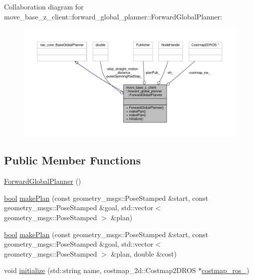 Collaboration diagram for move\+\_\+base\+\_\+z\+\_\+client\+:\+:forward\+\_\+global\+\_\+planner\+:\+:Forward\+Global\+Planner\+:\nopagebreak
\begin{figure}[H]
\begin{center}
\leavevmode
\includegraphics[width=350pt]{classmove__base__z__client_1_1forward__global__planner_1_1ForwardGlobalPlanner__coll__graph}
\end{center}
\end{figure}
\subsection*{Public Member Functions}
\begin{DoxyCompactItemize}
\item 
\hyperlink{classmove__base__z__client_1_1forward__global__planner_1_1ForwardGlobalPlanner_a9bbdde743629802b247441b8e955e114}{Forward\+Global\+Planner} ()
\item 
\hyperlink{classbool}{bool} \hyperlink{classmove__base__z__client_1_1forward__global__planner_1_1ForwardGlobalPlanner_a2dcf9aad74efaaa92ee78650f7a23096}{make\+Plan} (const geometry\+\_\+msgs\+::\+Pose\+Stamped \&start, const geometry\+\_\+msgs\+::\+Pose\+Stamped \&goal, std\+::vector$<$ geometry\+\_\+msgs\+::\+Pose\+Stamped $>$ \&plan)
\item 
\hyperlink{classbool}{bool} \hyperlink{classmove__base__z__client_1_1forward__global__planner_1_1ForwardGlobalPlanner_a16f21fc4735c26535517678d29a6f1f3}{make\+Plan} (const geometry\+\_\+msgs\+::\+Pose\+Stamped \&start, const geometry\+\_\+msgs\+::\+Pose\+Stamped \&goal, std\+::vector$<$ geometry\+\_\+msgs\+::\+Pose\+Stamped $>$ \&plan, double \&cost)
\item 
void \hyperlink{classmove__base__z__client_1_1forward__global__planner_1_1ForwardGlobalPlanner_aed754f82f2907720ed1410bb00922bf4}{initialize} (std\+::string name, costmap\+\_\+2d\+::\+Costmap2\+D\+R\+OS $\ast$\hyperlink{classmove__base__z__client_1_1forward__global__planner_1_1ForwardGlobalPlanner_aba11d85f5f4c9370873195ca97497a22}{costmap\+\_\+ros\+\_\+})
\end{DoxyCompactItemize}
